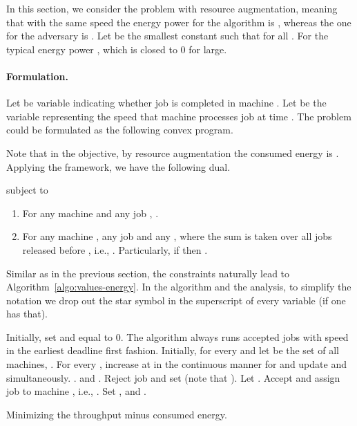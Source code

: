 \documentclass[11pt]{article}
\begin{document}
In this section, we consider the problem with resource augmentation, meaning that 
with the same speed  the energy power for the algorithm is , 
whereas the one for the adversary is . 
Let  be the smallest constant such that  for 
all . For the typical energy power , 
which is closed to 0 for  large.


\paragraph{Formulation.} Let  be variable indicating whether job  is completed
in machine . 
Let  be the variable representing the speed
that machine  processes job  at time .   
The problem could be formulated as the following convex program.
 
  
Note that in the objective, by resource augmentation the consumed energy 
is . 
Applying the framework, we have the following dual.

subject to
\begin{enumerate}
	\item For any machine  and any job , 
	. 
	\item For any machine , any job  and any , 
	 where the sum is taken over all jobs  released before ,
	i.e., . 
	Particularly, if  then . 
\end{enumerate}


Similar as in the previous section, the constraints naturally lead to Algorithm~\ref{algo:values-energy}.
In the algorithm and the analysis, to simplify the notation we drop out 
the star symbol in the superscript of every variable (if one has that). 


\begin{algorithm}[ht]
\begin{algorithmic}[1] 
\STATE Initially, set  and  equal to 0.
\STATE The algorithm always runs accepted jobs with speed  in the earliest deadline 
	first fashion. 
	\STATE Initially,  for every  and let  be the set of all machines,
		.
	\WHILE{}
		\STATE For every , 
		increase  at  in the continuous manner for 
		and update  and 
		 simultaneously. 
			\STATE .
		\ENDIF
			\STATE  and  .
		\ENDIF
	\ENDWHILE
	\IF{}
		\STATE Reject job  and set  (note that ).
	\ELSE
		\STATE Let .
		\STATE Accept and assign job  to machine , i.e., .
		\STATE Set , 
				and .
	\ENDIF
\ENDFOR
\end{algorithmic}
\caption{Minimizing the throughput minus consumed energy.}
\label{algo:values-energy}
\end{algorithm}
\end{document}
